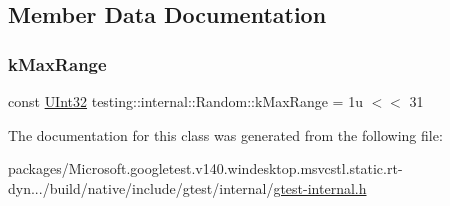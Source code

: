 \subsection{Member Data Documentation}
\mbox{\label{classtesting_1_1internal_1_1_random_a36d72dd7063d0b5338f229e75382fdd2}} 
\subsubsection{\texorpdfstring{kMaxRange}{kMaxRange}}
{\footnotesize\ttfamily const \mbox{\hyperlink{namespacetesting_1_1internal_a40d4fffcd2bf56f18b1c380615aa85e3}{U\+Int32}} testing\+::internal\+::\+Random\+::k\+Max\+Range = 1u $<$$<$ 31\hspace{0.3cm}{\ttfamily [static]}}



The documentation for this class was generated from the following file\+:\begin{DoxyCompactItemize}
\item 
packages/\+Microsoft.\+googletest.\+v140.\+windesktop.\+msvcstl.\+static.\+rt-\/dyn.../build/native/include/gtest/internal/\mbox{\hyperlink{gtest-internal_8h}{gtest-\/internal.\+h}}\end{DoxyCompactItemize}
